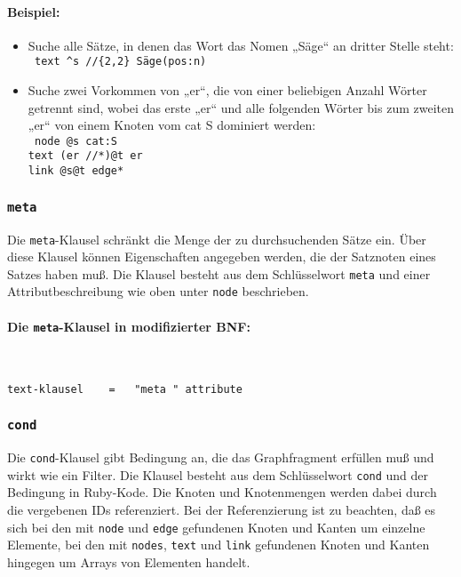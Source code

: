 \documentclass[12pt]{scrartcl}
\begin{document}
\paragraph*{Beispiel:}
\begin{itemize}
	\item Suche alle Sätze, in denen das Wort das Nomen „Säge“ an dritter Stelle steht:\\
	{\tt
	text \^{}s //\{2,2\} Säge(pos:n)
	}
	\item Suche zwei Vorkommen von „er“, die von einer beliebigen Anzahl Wörter getrennt sind, wobei das erste „er“ und alle folgenden Wörter bis zum zweiten „er“ von einem Knoten vom cat S dominiert werden:\\
	{\tt
	node @s cat:S\\
	text (er //*)@t er\\
	link @s@t edge*
	}
\end{itemize}



\subsubsection{\texttt{meta}}

Die \texttt{meta}-Klausel schränkt die Menge der zu durchsuchenden Sätze ein. Über diese Klausel können Eigenschaften angegeben werden, die der Satznoten eines Satzes haben muß. Die Klausel besteht aus dem Schlüsselwort \texttt{meta} und einer Attributbeschreibung wie oben unter \texttt{node} beschrieben.

\paragraph*{Die \texttt{meta}-Klausel in modifizierter BNF:}
~
\begin{framed}
\begin{lstlisting}
text-klausel    =   "meta " attribute
\end{lstlisting}
\end{framed}



\subsubsection{\texttt{cond}}\label{cond}

Die \texttt{cond}-Klausel gibt Bedingung an, die das Graphfragment erfüllen muß und wirkt wie ein Filter. Die Klausel besteht aus dem Schlüsselwort \texttt{cond} und der Bedingung in Ruby-Kode. Die Knoten und Knotenmengen werden dabei durch die vergebenen IDs referenziert. Bei der Referenzierung ist zu beachten, daß es sich bei den mit \texttt{node} und \texttt{edge} gefundenen Knoten und Kanten um einzelne Elemente, bei den mit \texttt{nodes}, \texttt{text} und \texttt{link} gefundenen Knoten und Kanten hingegen um Arrays von Elementen handelt.
\end{document}

